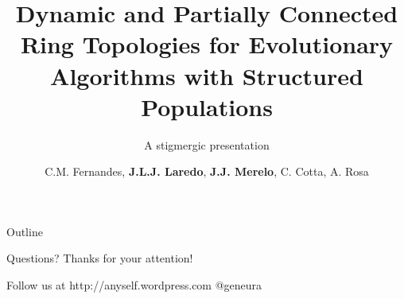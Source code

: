 \documentclass{beamer}[10]
\title{Dynamic and Partially Connected Ring Topologies for Evolutionary Algorithms with Structured Populations}
\subtitle{A stigmergic presentation}
\author{C.M. Fernandes, \textbf{J.L.J. Laredo}, \textbf{J.J. Merelo}, C. Cotta, A. Rosa}
\date{}
\begin{document}
\begin{frame}
  \titlepage
\end{frame}


\begin{frame}{Outline}
  \tableofcontents
\end{frame}






\begin{frame}{Questions?}
Thanks for your attention! 

Follow us at http://anyself.wordpress.com @geneura
\end{frame}
\end{document}
